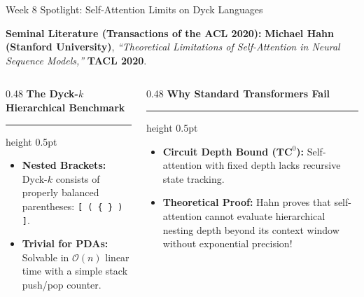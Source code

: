 \documentclass[aspectratio=169, 10pt]{beamer}
\newcommand{\colheader}[1]{%
  {\noindent\footnotesize\bfseries\color{gimpanavy}#1}%
  \vspace{0.03cm}%
  {\color{gimpanavy!30}\hrule height 0.5pt}%
  \vspace{0.08cm}%
}
\begin{document}
\begin{frame}{Week 8 Spotlight: Self-Attention Limits on Dyck Languages}
  \begin{tcolorbox}[spotlightcard, top=2pt, bottom=2pt, before=\vspace{0pt}, after=\vspace{2pt}]
    \footnotesize
    \textbf{Seminal Literature (Transactions of the ACL 2020):} 
    \textbf{Michael Hahn (Stanford University)}, \textit{``Theoretical Limitations of Self-Attention in Neural Sequence Models,''} \textbf{TACL 2020}.
  \end{tcolorbox}

  \vspace{0.04cm}
  \begin{columns}[T]
    \begin{column}{0.48\textwidth}
      \colheader{The Dyck-$k$ Hierarchical Benchmark}
      \begin{tcolorbox}[conceptcard, top=3pt, bottom=3pt]
        \begin{itemize}\setlength{\itemsep}{2.5pt}\footnotesize
          \item \textbf{Nested Brackets:} Dyck-$k$ consists of properly balanced parentheses: \texttt{[ ( \{ \} ) ]}.
          \item \textbf{Trivial for PDAs:} Solvable in $\mathcal{O}(n)$ linear time with a simple stack push/pop counter.
        \end{itemize}
      \end{tcolorbox}
    \end{column}

    \hfill

    \begin{column}{0.48\textwidth}
      \colheader{Why Standard Transformers Fail}
      \begin{tcolorbox}[alertcard, top=3pt, bottom=3pt]
        \begin{itemize}\setlength{\itemsep}{2.5pt}\footnotesize
          \item \textbf{Circuit Depth Bound ($\mathbf{TC}^0$):} Self-attention with fixed depth lacks recursive state tracking.
          \item \textbf{Theoretical Proof:} Hahn proves that self-attention cannot evaluate hierarchical nesting depth beyond its context window without exponential precision!
        \end{itemize}
      \end{tcolorbox}
    \end{column}
  \end{columns}
\end{frame}
\end{document}
